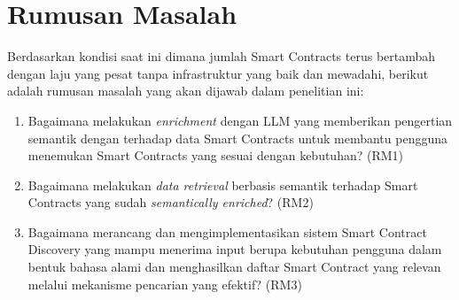 \section{Rumusan Masalah}
\label{sec:rumusan-masalah}

Berdasarkan kondisi saat ini dimana jumlah Smart Contracts terus bertambah dengan laju yang pesat tanpa infrastruktur yang baik dan mewadahi, berikut adalah rumusan masalah yang akan dijawab dalam penelitian ini:
\begin{enumerate}


	\item Bagaimana melakukan \textit{enrichment} dengan LLM yang memberikan pengertian semantik dengan terhadap data Smart Contracts untuk membantu pengguna menemukan Smart Contracts yang sesuai dengan kebutuhan? (RM1)

	\item Bagaimana melakukan \textit{data retrieval} berbasis semantik terhadap Smart Contracts yang sudah \textit{semantically enriched}? (RM2)
	\item Bagaimana merancang dan mengimplementasikan sistem Smart Contract Discovery yang mampu menerima input berupa kebutuhan pengguna dalam bentuk bahasa alami dan menghasilkan daftar Smart Contract yang relevan melalui mekanisme pencarian yang efektif? (RM3)


\end{enumerate}
